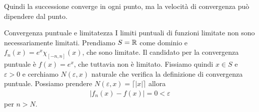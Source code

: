 \documentclass[a4paper]{article}
\begin{document}
\begin{radioactive}
    Quindi la successione converge in ogni punto, ma la velocità di convergenza può dipendere dal punto.
\end{radioactive}

\begin{radioactive}
    \begin{snippetexample}{Convergenza puntuale e limitatezza}
        I limiti puntuali di funzioni limitate non sono necessariamente limitati.
        Prendiamo \(S = \mathbb{R}\) come dominio e \(f_n(x) = e^x \chi_{[-n, n]}(x)\), che sono limitate.
        Il candidato per la convergenza puntuale è \(f(x) = e^x\), che tuttavia non è limitato.
        Fissiamo quindi \(x \in S\) e \(\varepsilon > 0\) e cerchiamo
        \(N(\varepsilon, x)\) naturale che verifica la definizione di convergenza puntuale.
        Possiamo prendere \(N(\varepsilon, x) = \lceil |x| \rceil\) allora
        \begin{align*}
            |f_n(x) - f(x)| = 0 < \varepsilon
        \end{align*}
        per \(n > N\).
    \end{snippetexample}
\end{radioactive}
\end{document}
